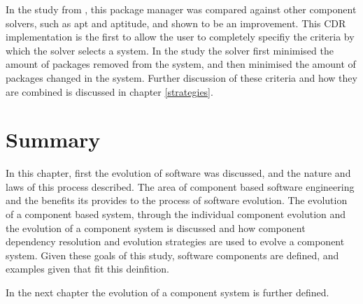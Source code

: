 In the study from \cite{abate2011}, this package manager was compared against other component solvers, such as apt and aptitude, and shown to be an improvement.
This CDR implementation is the first to allow the user to completely specifiy the criteria by which the solver selects a system.
In the study the solver first minimised the amount of packages removed from the system, and then minimised the amount of packages changed in the system.
Further discussion of these criteria and how they are combined is discussed in chapter \ref{strategies}. 

\section{Summary}

In this chapter, first the evolution of software was discussed, and the nature and laws of this process described.
The area of component based software engineering and the benefits its provides to the process of software evolution.
The evolution of a component based system, through the individual component evolution and the evolution of a component system is discussed
and how component dependency resolution and evolution strategies are used to evolve a component system.
Given these goals of this study, software components are defined, and examples given that fit this deinfition.

In the next chapter the evolution of a component system is further defined.













